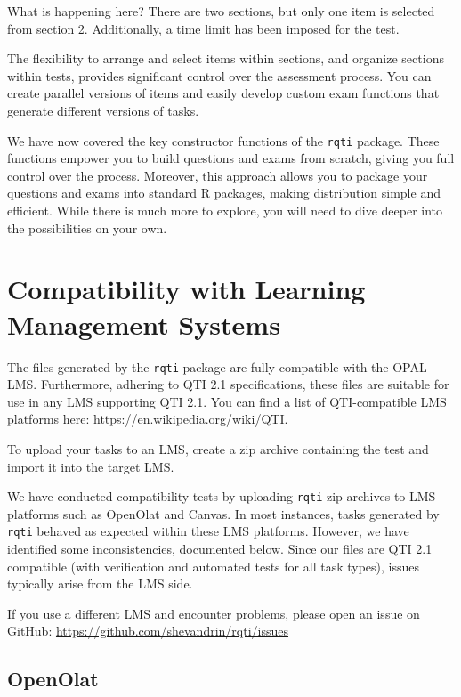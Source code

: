 \documentclass[twoside]{tufte-book}
\begin{document}
What is happening here? There are two sections, but only one item is selected from section 2. Additionally, a time limit has been imposed for the test.

The flexibility to arrange and select items within sections, and organize sections within tests, provides significant control over the assessment process. You can create parallel versions of items and easily develop custom exam functions that generate different versions of tasks.

We have now covered the key constructor functions of the \texttt{rqti} package. These functions empower you to build questions and exams from scratch, giving you full control over the process. Moreover, this approach allows you to package your questions and exams into standard R packages, making distribution simple and efficient. While there is much more to explore, you will need to dive deeper into the possibilities on your own.

\chapter{Compatibility with Learning Management Systems}\label{compatibility-with-learning-management-systems}

The files generated by the \texttt{rqti} package are fully compatible with the OPAL LMS. Furthermore, adhering to QTI 2.1 specifications, these files are suitable for use in any LMS supporting QTI 2.1. You can find a list of QTI-compatible LMS platforms here: \url{https://en.wikipedia.org/wiki/QTI}.

To upload your tasks to an LMS, create a zip archive containing the test and import it into the target LMS.

We have conducted compatibility tests by uploading \texttt{rqti} zip archives to LMS platforms such as OpenOlat and Canvas. In most instances, tasks generated by \texttt{rqti} behaved as expected within these LMS platforms. However, we have identified some inconsistencies, documented below. Since our files are QTI 2.1 compatible (with verification and automated tests for all task types), issues typically arise from the LMS side.

If you use a different LMS and encounter problems, please open an issue on GitHub: \url{https://github.com/shevandrin/rqti/issues}

\section{OpenOlat}\label{openolat}
\end{document}
